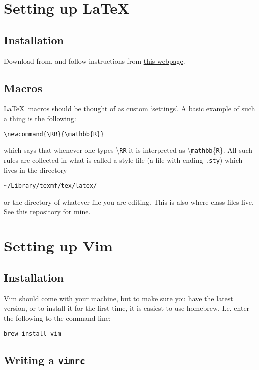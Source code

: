 \documentclass{amsart}
\begin{document}
\section{Setting up \LaTeX}

\subsection{Installation}

Download from, and follow instructions from \href{http://www.tug.org/mactex/}{this
webpage}.

\subsection{Macros}

\LaTeX\ macros should be thought of as custom `settings'. A basic example of such a thing
is the following:
\begin{verbatim}
\newcommand{\RR}{\mathbb{R}}
\end{verbatim}
which says that whenever one types \textbackslash\texttt{RR}
it is interpreted as \textbackslash\texttt{mathbb}\{\texttt{R}\}. All such rules are collected in what
is called a style file (a file with ending \texttt{.sty}) which lives in the directory 
\begin{verbatim}
~/Library/texmf/tex/latex/
\end{verbatim}
or the directory of whatever file you are editing. This is also where class files live.
See \href{https://github.com/jacksontvd/tex/tree/master/tex/latex}{this repository} for
mine.

\section{Setting up Vim}

\subsection{Installation}

Vim should come with your machine, but to make sure you have the latest version, or to
install it for the first time, it is easiest to use homebrew. I.e. enter the following to
the command line:
\begin{verbatim}
brew install vim
\end{verbatim}

\subsection{Writing a \texttt{vimrc}}
\label{sec:vimrc}
\end{document}
